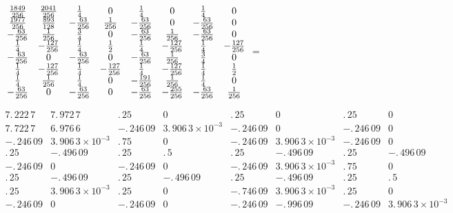 \documentclass{article}
\begin{document}
$\allowbreak 
\begin{array}{cccccccc}
\frac{1849}{256} & \frac{2041}{256} & \frac{1}{4} & 0 & \frac{1}{4} & 0 & 
\frac{1}{4} & 0 \\ 
\frac{1977}{256} & \frac{893}{128} & -\frac{63}{256} & \frac{1}{256} & -%
\frac{63}{256} & 0 & -\frac{63}{256} & 0 \\ 
-\frac{63}{256} & \frac{1}{256} & \frac{3}{4} & 0 & -\frac{63}{256} & \frac{1%
}{256} & -\frac{63}{256} & 0 \\ 
\frac{1}{4} & -\frac{127}{256} & \frac{1}{4} & \frac{1}{2} & \frac{1}{4} & -%
\frac{127}{256} & \frac{1}{4} & -\frac{127}{256} \\ 
-\frac{63}{256} & 0 & -\frac{63}{256} & 0 & -\frac{63}{256} & \frac{1}{256}
& \frac{3}{4} & 0 \\ 
\frac{1}{4} & -\frac{127}{256} & \frac{1}{4} & -\frac{127}{256} & \frac{1}{4}
& -\frac{127}{256} & \frac{1}{4} & \frac{1}{2} \\ 
\frac{1}{4} & \frac{1}{256} & \frac{1}{4} & 0 & -\frac{191}{256} & \frac{1}{%
256} & \frac{1}{4} & 0 \\ 
-\frac{63}{256} & 0 & -\frac{63}{256} & 0 & -\frac{63}{256} & -\frac{255}{256%
} & -\frac{63}{256} & \frac{1}{256}
\end{array}
\allowbreak =$

$\allowbreak 
\begin{array}{cccccccc}
7.\,\allowbreak 222\,7 & 7.\,\allowbreak 972\,7 & .\,\allowbreak 25 & 0 & 
.\,\allowbreak 25 & 0 & .\,\allowbreak 25 & 0 \\ 
7.\,\allowbreak 722\,7 & 6.\,\allowbreak 976\,6 & -.\,\allowbreak 246\,09 & 
3.\,\allowbreak 906\,3\times 10^{-3} & -.\,\allowbreak 246\,09 & 0 & 
-.\,\allowbreak 246\,09 & 0 \\ 
-.\,\allowbreak 246\,09 & 3.\,\allowbreak 906\,3\times 10^{-3} & 
.\,\allowbreak 75 & 0 & -.\,\allowbreak 246\,09 & 3.\,\allowbreak
906\,3\times 10^{-3} & -.\,\allowbreak 246\,09 & 0 \\ 
.\,\allowbreak 25 & -.\,\allowbreak 496\,09 & .\,\allowbreak 25 & 
.\,\allowbreak 5 & .\,\allowbreak 25 & -.\,\allowbreak 496\,09 & 
.\,\allowbreak 25 & -.\,\allowbreak 496\,09 \\ 
-.\,\allowbreak 246\,09 & 0 & -.\,\allowbreak 246\,09 & 0 & -.\,\allowbreak
246\,09 & 3.\,\allowbreak 906\,3\times 10^{-3} & .\,\allowbreak 75 & 0 \\ 
.\,\allowbreak 25 & -.\,\allowbreak 496\,09 & .\,\allowbreak 25 & 
-.\,\allowbreak 496\,09 & .\,\allowbreak 25 & -.\,\allowbreak 496\,09 & 
.\,\allowbreak 25 & .\,\allowbreak 5 \\ 
.\,\allowbreak 25 & 3.\,\allowbreak 906\,3\times 10^{-3} & .\,\allowbreak 25
& 0 & -.\,\allowbreak 746\,09 & 3.\,\allowbreak 906\,3\times 10^{-3} & 
.\,\allowbreak 25 & 0 \\ 
-.\,\allowbreak 246\,09 & 0 & -.\,\allowbreak 246\,09 & 0 & -.\,\allowbreak
246\,09 & -.\,\allowbreak 996\,09 & -.\,\allowbreak 246\,09 & 
3.\,\allowbreak 906\,3\times 10^{-3}
\end{array}
\allowbreak $
\end{document}
